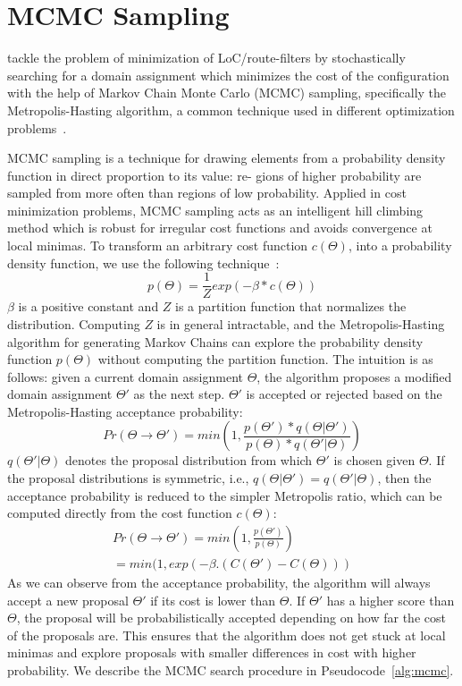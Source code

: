 \section{MCMC Sampling}
\name tackle the problem of minimization of LoC/route-filters
by stochastically searching for a domain assignment which 
minimizes the cost of the configuration with the help of Markov
Chain Monte Carlo (MCMC) sampling, specifically the Metropolis-Hasting
algorithm, a common technique used in different optimization 
problems~\cite{stoke}. 

MCMC sampling is a technique for drawing elements from a
probability density function in direct proportion to its value: re-
gions of higher probability are sampled from more often than 
regions of low probability.
Applied in cost minimization problems,
MCMC sampling acts as an intelligent hill climbing method which
is robust for irregular cost functions and avoids convergence at 
local minimas. To transform an arbitrary cost function $c(\Theta)$, 
into a probability density function, we use the following 
technique~\cite{mcmcbook}:
\begin{equation}
	p(\Theta) = \frac{1}{Z}exp(-\beta * c(\Theta))
\end{equation}
$\beta$ is a positive constant and $Z$ is a partition function that
normalizes the distribution. Computing $Z$ is in general 
intractable, and the Metropolis-Hasting algorithm for 
generating Markov Chains can explore the probability density
function $p(\Theta)$ without computing the partition function. 
The intuition is as follows: given a current domain
assignment $\Theta$, the algorithm proposes a modified 
domain assignment $\Theta'$ as the next step. $\Theta'$
is accepted or rejected based on the Metropolis-Hasting
acceptance probability: 
\begin{equation}
Pr(\Theta \rightarrow \Theta') = min(1, \frac{p(\Theta')*q(\Theta| \Theta')}{p(\Theta)*q(\Theta'| \Theta)})
\end{equation}
$q(\Theta'| \Theta)$ denotes the proposal distribution from 
which $\Theta'$ is chosen given $\Theta$. If the proposal 
distributions is symmetric, i.e., 
$q(\Theta| \Theta') = q(\Theta'| \Theta)$, then the acceptance
probability is reduced to the simpler Metropolis ratio, which
can be computed directly from the cost function $c(\Theta)$:
\begin{multline}
Pr(\Theta \rightarrow \Theta') = min(1, \frac{p(\Theta')}{p(\Theta)}) \\
= min(1, exp(-\beta.(C(\Theta') - C(\Theta)))
\end{multline}
As we can observe from the acceptance probability, 
the algorithm will always accept a new proposal $\Theta'$
if its cost is lower than $\Theta$. If $\Theta'$ has a 
higher score than $\Theta$, the proposal will be 
probabilistically accepted depending on 
how far the cost of the proposals are. This ensures that 
the algorithm does not get stuck at local minimas and 
explore proposals with smaller differences in cost with 
higher probability. We describe the MCMC search procedure 
in Pseudocode~\cref{alg:mcmc}. 

